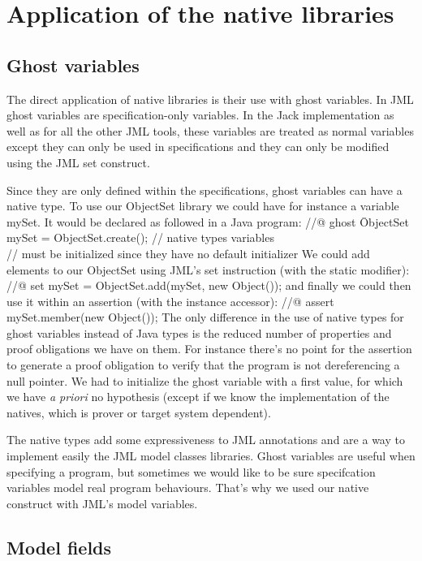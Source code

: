\section{Application of the native libraries}
\subsection{Ghost variables}
The direct application of native libraries is their use with  ghost variables. 
In JML ghost variables are specification-only variables.
In the Jack implementation as well as for all the other JML tools, 
these variables are treated as normal variables
except they can only be used in specifications and they can only be modified 
using the JML set construct.
 
Since they are only defined within the specifications, ghost variables 
can have a native type. 
To use our ObjectSet library we could have for instance a variable mySet. 
It would be declared as followed in a Java program:
\btab
 //@ ghost \=ObjectSet mySet = ObjectSet.create(); // native types variables\\
\>//  must be initialized since they have no default initializer
 \etab
 We could add elements to our ObjectSet using JML's set instruction (with the static modifier):
 \btab
 //@ set mySet = ObjectSet.add(mySet, new Object());
 \etab
and  finally we could then use it within an assertion (with the instance accessor):
\btab
 //@ assert mySet.member(new Object());
 \etab
The only difference in the use of native types for ghost variables instead 
of Java types is the reduced number of properties and proof obligations 
we have on them. For instance there's no point for the assertion to generate 
a proof obligation  to verify that the program is not dereferencing a 
null pointer. We had to initialize the ghost variable with a first value, 
for which we have {\it a priori} no hypothesis  (except if we know the
 implementation  of the natives, which is prover or target system dependent).

The native types add some expressiveness to JML annotations and are a way 
to implement easily the JML model classes libraries.
Ghost variables are useful when specifying a program, but sometimes 
we would like to be sure specifcation variables model real program behaviours.
That's why we used our native construct with JML's model variables.



\subsection{Model fields}
